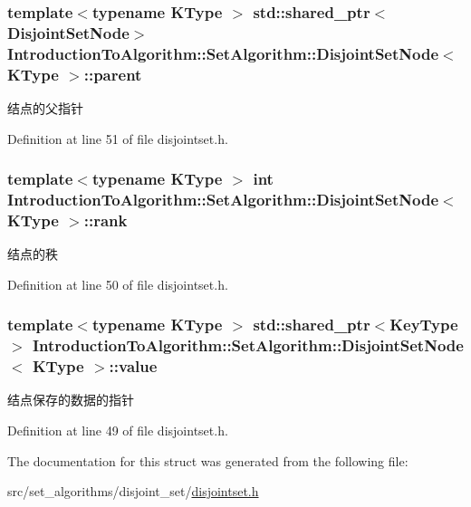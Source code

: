 \subsubsection[{parent}]{\setlength{\rightskip}{0pt plus 5cm}template$<$typename K\+Type $>$ std\+::shared\+\_\+ptr$<${\bf Disjoint\+Set\+Node}$>$ {\bf Introduction\+To\+Algorithm\+::\+Set\+Algorithm\+::\+Disjoint\+Set\+Node}$<$ K\+Type $>$\+::parent}\label{struct_introduction_to_algorithm_1_1_set_algorithm_1_1_disjoint_set_node_ad5cf3f4d739ecd0c1f6d3b3005e21993}
结点的父指针 

Definition at line 51 of file disjointset.\+h.

\hypertarget{struct_introduction_to_algorithm_1_1_set_algorithm_1_1_disjoint_set_node_a1fd137f74ca1317bfb02d9e1640ce147}{}
\subsubsection[{rank}]{\setlength{\rightskip}{0pt plus 5cm}template$<$typename K\+Type $>$ int {\bf Introduction\+To\+Algorithm\+::\+Set\+Algorithm\+::\+Disjoint\+Set\+Node}$<$ K\+Type $>$\+::rank}\label{struct_introduction_to_algorithm_1_1_set_algorithm_1_1_disjoint_set_node_a1fd137f74ca1317bfb02d9e1640ce147}
结点的秩 

Definition at line 50 of file disjointset.\+h.

\hypertarget{struct_introduction_to_algorithm_1_1_set_algorithm_1_1_disjoint_set_node_a03e58ee7a2d6949283fafcd1de53e53b}{}
\subsubsection[{value}]{\setlength{\rightskip}{0pt plus 5cm}template$<$typename K\+Type $>$ std\+::shared\+\_\+ptr$<${\bf Key\+Type}$>$ {\bf Introduction\+To\+Algorithm\+::\+Set\+Algorithm\+::\+Disjoint\+Set\+Node}$<$ K\+Type $>$\+::value}\label{struct_introduction_to_algorithm_1_1_set_algorithm_1_1_disjoint_set_node_a03e58ee7a2d6949283fafcd1de53e53b}
结点保存的数据的指针 

Definition at line 49 of file disjointset.\+h.



The documentation for this struct was generated from the following file\+:\begin{DoxyCompactItemize}
\item 
src/set\+\_\+algorithms/disjoint\+\_\+set/\hyperlink{disjointset_8h}{disjointset.\+h}\end{DoxyCompactItemize}
